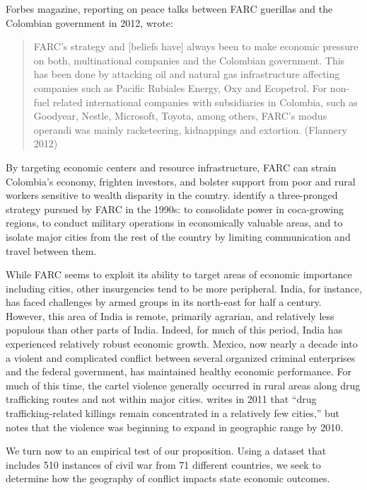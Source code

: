 Forbes magazine, reporting on peace talks between FARC guerillas and the Colombian government in 2012, wrote: 
\begin{quote}FARC's strategy and [beliefs have] always been to make economic pressure on both, multinational companies and the Colombian government. This has been done by attacking oil and natural gas infrastructure affecting companies such as Pacific Rubiales Energy, Oxy and Ecopetrol. For non-fuel related international companies with subsidiaries in Colombia, such as Goodyear, Nestle, Microsoft, Toyota, among others, FARC’s modus operandi was mainly racketeering, kidnappings and extortion. (Flannery 2012)\end{quote}
By targeting economic centers and resource infrastructure, FARC can strain Colombia's economy, frighten investors, and bolster support from poor and rural workers sensitive to wealth disparity in the country.  \cite{rabasa:chalk:2001} identify a three-pronged strategy pursued by FARC in the 1990s: to consolidate power in coca-growing regions, to conduct military operations in economically valuable areas, and to isolate major cities from the rest of the country by limiting communication and travel between them.    

While FARC seems to exploit its ability to target areas of economic importance including cities, other insurgencies tend to be more peripheral.  India, for instance, has faced challenges by armed groups in its north-east for half a century.  However, this area of India is remote, primarily agrarian, and relatively less populous than other parts of India.  Indeed, for much of this period, India has experienced relatively robust economic growth.  Mexico, now nearly a decade into a violent and complicated conflict between several organized criminal enterprises and the federal government, has maintained healthy economic performance.  For much of this time, the cartel violence generally occurred in rural areas along drug trafficking routes and not within major cities. \cite{beittel:2011} writes in 2011 that ``drug trafficking-related killings remain concentrated in a relatively few cities,'' but notes that the violence was beginning to expand in geographic range by 2010.

We turn now to an empirical test of our proposition.  Using a dataset that includes 510 instances of civil war from 71 different countries, we seek to determine how the geography of conflict impacts state economic outcomes.


%
